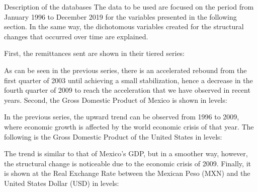     \frame{\sectionpage}
    \begin{frame}{Description of the databases}
The data to be used are focused on the period from January 1996 to December 2019 for the variables presented in the following section. In the same way, the dichotomous variables created for the structural changes that occurred over time are explained.\par
First, the remittances sent are shown in their tiered series:\par
As can be seen in the previous series, there is an accelerated rebound from the first quarter of 2003 until achieving a small stabilization, hence a decrease in the fourth quarter of 2009 to reach the acceleration that we have observed in recent years.  Second, the Gross Domestic Product of Mexico is shown in levels:\par
	In the previous series, the upward trend can be observed from 1996 to 2009, where economic growth is affected by the world economic crisis of that year. The following is the Gross Domestic Product of the United States in levels:\par
The trend is similar to that of Mexico's GDP, but in a smoother way, however, the structural change is noticeable due to the economic crisis of 2009.  Finally, it is shown at the Real Exchange Rate between the Mexican Peso (MXN) and the United States Dollar (USD) in levels:\par
\end{frame}

